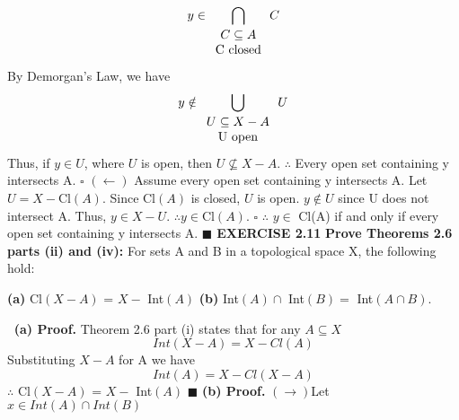 \documentclass[12pt]{article}
\begin{document}
\[y \in \bigcap_{\begin{array}{ccc}C \subseteq A \\ \textup{C closed} \end{array}}C\]
By Demorgan's Law, we have
\[y \notin \bigcup_{\begin{array}{ccc}U \subseteq X-A \\ \textup{U open} \end{array}}U\]
Thus, if \(y \in U\), where \(U\) is open, then \(U \nsubseteq X - A\). \newline
\(\therefore\) Every open set containing y intersects A.
\newline \(\square\) \newline
\((\leftarrow)\) Assume every open set containing y intersects A.
\newline
Let \(U = X - \)Cl\((A)\).
\newline
Since Cl\((A)\) is closed, \(U\) is open.
\newline
\(y \notin U\) since U does not intersect A.
\newline
Thus, \(y \in X - U\).
\newline
\(\therefore y \in \)Cl\((A)\).
\newline \(\square\) \newline
\(\therefore\) \(y \in\) Cl(A) if and only if every open set containing y intersects A. \newline \(\blacksquare\)
\newpage
\noindent
\textbf{EXERCISE 2.11} \textbf{Prove Theorems 2.6 parts (ii) and (iv):} For sets A and B in a topological space X, the following hold:
\begin{adjustwidth}{1cm}{0cm}
	\begin{flushleft}
		\textbf{(a)} Cl\((X-A)\) = \(X - \) Int\((A)\) \newline
		\textbf{(b)} Int\((A) \cap \) Int\((B) = \) Int\((A \cap B)\).
\end{flushleft}
\end{adjustwidth}
\(\ \)
\newline
\textbf{(a) Proof.} \newline
Theorem 2.6 part (i) states that for any \(A \subseteq X\)
\[Int(X-A) = X - Cl(A)\]
Substituting \(X-A\) for A we have
\[Int(A) = X - Cl(X-A)\]
\(\therefore\) Cl\((X-A)\) = \(X - \) Int\((A)\)
\newline \(\blacksquare\) \newline
\textbf{(b) Proof.} \newline
\((\rightarrow)\)Let \(x \in Int(A) \cap Int(B)\) \newline
\end{document}
